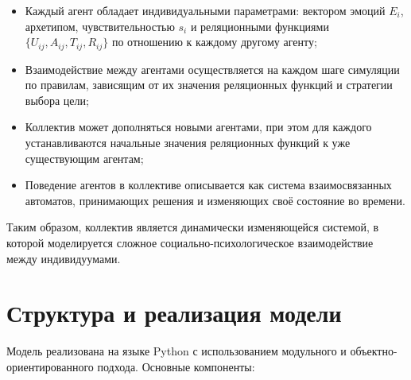 \documentclass[12pt]{article}
\begin{document}
\begin{itemize}
    \item Каждый агент обладает индивидуальными параметрами: вектором эмоций \( E_i \), архетипом, чувствительностью \( s_i \) и реляционными функциями \( \{ U_{ij}, A_{ij}, T_{ij}, R_{ij} \} \) по отношению к каждому другому агенту;
    \item Взаимодействие между агентами осуществляется на каждом шаге симуляции по правилам, зависящим от их значения реляционных функций и стратегии выбора цели;
    \item Коллектив может дополняться новыми агентами, при этом для каждого устанавливаются начальные значения реляционных функций к уже существующим агентам;
    \item Поведение агентов в коллективе описывается как система взаимосвязанных автоматов, принимающих решения и изменяющих своё состояние во времени.
\end{itemize}

Таким образом, коллектив является динамически изменяющейся системой, в которой моделируется сложное социально-психологическое взаимодействие между индивидуумами.

\section{Структура и реализация модели}

Модель реализована на языке Python с использованием модульного и объектно-ориентированного подхода. Основные компоненты:
\end{document}
